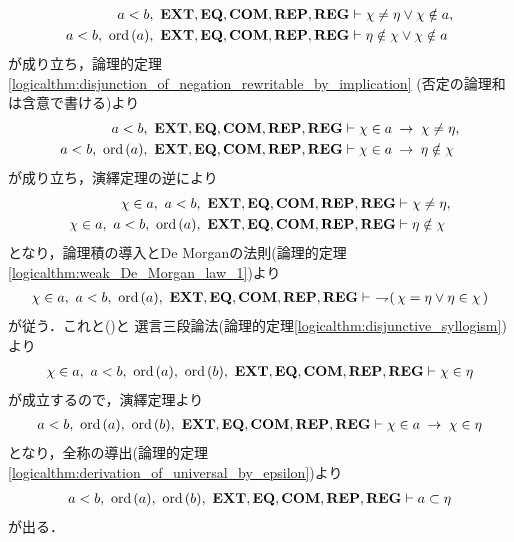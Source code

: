 \begin{prf}
\begin{description}
				\begin{align}
					a < b,\ \EXTAX,\EQAX,\COMAX,\REPAX,\REGAX &\vdash \chi \neq \eta \vee \chi \notin a, \\
					a < b,\ \ord{a},\ \EXTAX,\EQAX,\COMAX,\REPAX,\REGAX &\vdash \eta \notin \chi \vee \chi \notin a
				\end{align}
				が成り立ち，論理的定理\ref{logicalthm:disjunction_of_negation_rewritable_by_implication}
				(否定の論理和は含意で書ける)より
				\begin{align}
					a < b,\ \EXTAX,\EQAX,\COMAX,\REPAX,\REGAX 
					&\vdash \chi \in a \rarrow \chi \neq \eta, \\
					a < b,\ \ord{a},\ \EXTAX,\EQAX,\COMAX,\REPAX,\REGAX 
					&\vdash \chi \in a \rarrow \eta \notin \chi
				\end{align}
				が成り立ち，演繹定理の逆により
				\begin{align}
					\chi \in a,\ a < b,\ \EXTAX,\EQAX,\COMAX,\REPAX,\REGAX &\vdash \chi \neq \eta,
					\label{fom:element_and_proper_subset_correspond_14} \\
					\chi \in a,\ a < b,\ \ord{a},\ \EXTAX,\EQAX,\COMAX,\REPAX,\REGAX &\vdash \eta \notin \chi
					\label{fom:element_and_proper_subset_correspond_15}
				\end{align}
				となり，論理積の導入とDe Morganの法則(論理的定理\ref{logicalthm:weak_De_Morgan_law_1})より
				\begin{align}
					\chi \in a,\ a < b,\ \ord{a},\ \EXTAX,\EQAX,\COMAX,\REPAX,\REGAX \vdash\ 
					\negation (\, \chi = \eta \vee \eta \in \chi\, )
				\end{align}
				が従う．これと()と
				選言三段論法(論理的定理\ref{logicalthm:disjunctive_syllogism})より
				\begin{align}
					\chi \in a,\ a < b,\ \ord{a},\ \ord{b},\ \EXTAX,\EQAX,\COMAX,\REPAX,\REGAX \vdash \chi \in \eta
				\end{align}
				が成立するので，演繹定理より
				\begin{align}
					a < b,\ \ord{a},\ \ord{b},\ \EXTAX,\EQAX,\COMAX,\REPAX,\REGAX \vdash 
					\chi \in a \rarrow \chi \in \eta
				\end{align}
				となり，全称の導出(論理的定理\ref{logicalthm:derivation_of_universal_by_epsilon})より
				\begin{align}
					a < b,\ \ord{a},\ \ord{b},\ \EXTAX,\EQAX,\COMAX,\REPAX,\REGAX \vdash a \subset \eta
					\label{fom:element_and_proper_subset_correspond_16}
				\end{align}
				が出る．
			

\end{description}
\end{prf}
